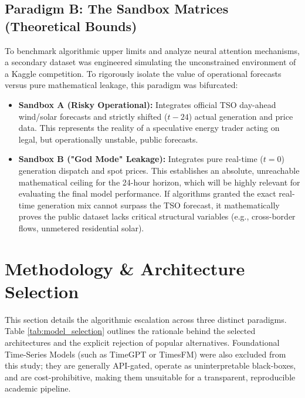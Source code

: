 \documentclass{article}
\begin{document}
\subsection*{Paradigm B: The Sandbox Matrices (Theoretical Bounds)}
To benchmark algorithmic upper limits and analyze neural attention mechanisms, a secondary dataset was engineered simulating the unconstrained environment of a Kaggle competition. To rigorously isolate the value of operational forecasts versus pure mathematical leakage, this paradigm was bifurcated:
\begin{itemize}
    \item \textbf{Sandbox A (Risky Operational):} Integrates official TSO day-ahead wind/solar forecasts and strictly shifted ($t-24$) actual generation and price data. This represents the reality of a speculative energy trader acting on legal, but operationally unstable, public forecasts.
    \item \textbf{Sandbox B ("God Mode" Leakage):} Integrates pure real-time ($t=0$) generation dispatch and spot prices. This establishes an absolute, unreachable mathematical ceiling for the 24-hour horizon, which will be highly relevant for evaluating the final model performance. If algorithms granted the exact real-time generation mix cannot surpass the TSO forecast, it mathematically proves the public dataset lacks critical structural variables (e.g., cross-border flows, unmetered residential solar).
\end{itemize}

\section{Methodology \& Architecture Selection}

This section details the algorithmic escalation across three distinct paradigms. Table \ref{tab:model_selection} outlines the rationale behind the selected architectures and the explicit rejection of popular alternatives. Foundational Time-Series Models (such as TimeGPT or TimesFM) were also excluded from this study; they are generally API-gated, operate as uninterpretable black-boxes, and are cost-prohibitive, making them unsuitable for a transparent, reproducible academic pipeline.
\end{document}
